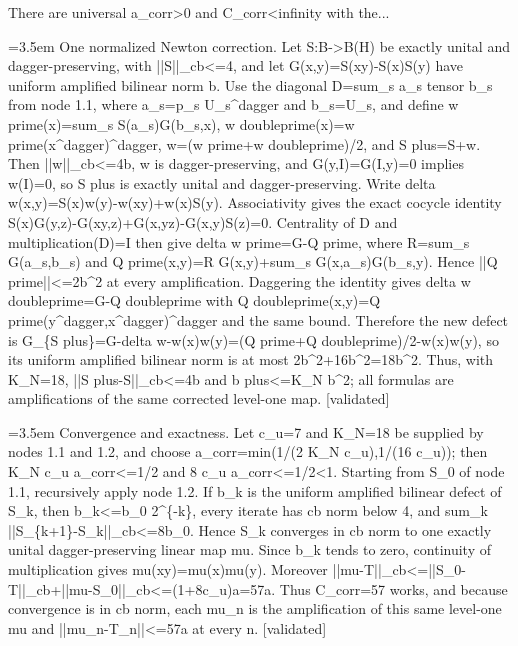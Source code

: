 \documentclass{article}
\newcommand{\step}[1]{\par\noindent\hangindent=3.5em\hangafter=1%
  \makebox[3.5em][l]{\textbf{#1.}}}
\newcommand{\steptag}[1]{\hfill{\small\textsf{[#1]}}}
\begin{document}
\begin{proofbox}{There are universal a\_corr>0 and C\_corr<infinity with the...}
\step{1.2} One normalized Newton correction. Let S:B->B(H) be exactly unital and dagger-preserving, with ||S||\_cb<=4, and let G(x,y)=S(xy)-S(x)S(y) have uniform amplified bilinear norm b. Use the diagonal D=sum\_s a\_s tensor b\_s from node 1.1, where a\_s=p\_s U\_s\textasciicircum{}dagger and b\_s=U\_s, and define w prime(x)=sum\_s S(a\_s)G(b\_s,x), w doubleprime(x)=w prime(x\textasciicircum{}dagger)\textasciicircum{}dagger, w=(w prime+w doubleprime)/2, and S plus=S+w. Then ||w||\_cb<=4b, w is dagger-preserving, and G(y,I)=G(I,y)=0 implies w(I)=0, so S plus is exactly unital and dagger-preserving. Write delta w(x,y)=S(x)w(y)-w(xy)+w(x)S(y). Associativity gives the exact cocycle identity S(x)G(y,z)-G(xy,z)+G(x,yz)-G(x,y)S(z)=0. Centrality of D and multiplication(D)=I then give delta w prime=G-Q prime, where R=sum\_s G(a\_s,b\_s) and Q prime(x,y)=R G(x,y)+sum\_s G(x,a\_s)G(b\_s,y). Hence ||Q prime||<=2b\textasciicircum{}2 at every amplification. Daggering the identity gives delta w doubleprime=G-Q doubleprime with Q doubleprime(x,y)=Q prime(y\textasciicircum{}dagger,x\textasciicircum{}dagger)\textasciicircum{}dagger and the same bound. Therefore the new defect is G\_\{S plus\}=G-delta w-w(x)w(y)=(Q prime+Q doubleprime)/2-w(x)w(y), so its uniform amplified bilinear norm is at most 2b\textasciicircum{}2+16b\textasciicircum{}2=18b\textasciicircum{}2. Thus, with K\_N=18, ||S plus-S||\_cb<=4b and b plus<=K\_N b\textasciicircum{}2; all formulas are amplifications of the same corrected level-one map. \steptag{validated} \\[4pt]
\step{1.3} Convergence and exactness. Let c\_u=7 and K\_N=18 be supplied by nodes 1.1 and 1.2, and choose a\_corr=min(1/(2 K\_N c\_u),1/(16 c\_u)); then K\_N c\_u a\_corr<=1/2 and 8 c\_u a\_corr<=1/2<1. Starting from S\_0 of node 1.1, recursively apply node 1.2. If b\_k is the uniform amplified bilinear defect of S\_k, then b\_k<=b\_0 2\textasciicircum{}\{-k\}, every iterate has cb norm below 4, and sum\_k ||S\_\{k+1\}-S\_k||\_cb<=8b\_0. Hence S\_k converges in cb norm to one exactly unital dagger-preserving linear map mu. Since b\_k tends to zero, continuity of multiplication gives mu(xy)=mu(x)mu(y). Moreover ||mu-T||\_cb<=||S\_0-T||\_cb+||mu-S\_0||\_cb<=(1+8c\_u)a=57a. Thus C\_corr=57 works, and because convergence is in cb norm, each mu\_n is the amplification of this same level-one mu and ||mu\_n-T\_n||<=57a at every n. \steptag{validated} \\[6pt]

\end{proofbox}
\end{document}
